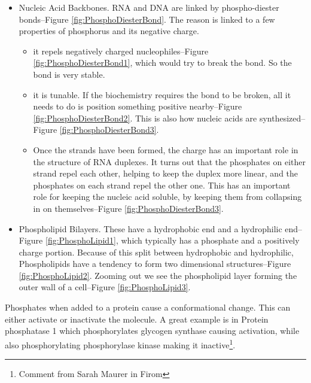 \documentclass[]{article}
\begin{document}
\begin{itemize}
	\item Nucleic Acid Backbones. RNA and DNA are linked by phospho-diester bonds--Figure \ref{fig:PhosphoDiesterBond}. The reason is linked to a few properties of phosphorus and its negative charge.
	\begin{itemize}
		\item it repels negatively charged nucleophiles--Figure \ref{fig:PhosphoDiesterBond1}, which would try to break the bond. So the bond is very stable.
		\item it is tunable. If the biochemistry requires the bond to be broken, all it needs to do is position something positive nearby--Figure \ref{fig:PhosphoDiesterBond2}. This is also how nucleic acids are synthesized--Figure \ref{fig:PhosphoDiesterBond3}.
		\item Once the strands have been formed, the charge has an important role in the structure of RNA duplexes. It turns out that the phosphates on either strand repel each other, helping to keep the duplex more linear, and the phosphates on each strand repel the other one. This has an important role for keeping the nucleic acid soluble, by keeping them from collapsing in on themselves--Figure \ref{fig:PhosphoDiesterBond3}.
	\end{itemize}
	\item Phospholipid Bilayers. These have a hydrophobic end and a hydrophilic end--Figure \ref{fig:PhosphoLipid1}, which typically has a phosphate and a positively charge portion. Because of this split between hydrophobic and hydrophilic, Phospholipids have a tendency to form two dimensional structures--Figure \ref{fig:PhosphoLipid2}. Zooming out we see the phospholipid layer forming the outer wall of a cell--Figure \ref{fig:PhosphoLipid3}.
\end{itemize}


Phosphates when added to a protein cause a conformational change. This can either activate or inactivate the molecule. A great example is in Protein phosphatase 1 which phosphorylates glycogen synthase causing activation, while also phosphorylating phosphorylase kinase making it inactive\footnote{Comment from Sarah Maurer in Firom}.
\end{document}
